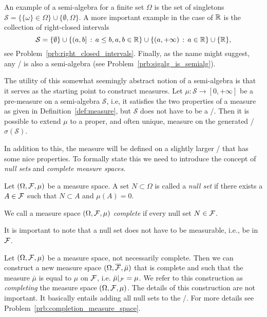 An example of a semi-algebra for a finite set $\Omega$ is the set of singletons $\mathcal{S} = \{\{\omega\} \in \Omega\} \cup \{\emptyset, \Omega\}$. A more important example in the case of $\mathbb R$ is the collection of right-closed intervals
\begin{equation}\label{def:right_closed_intervals}
	\mathcal{S} = \{\emptyset\} \cup \{(a,b] \, : \, a\le b, a, b \in \mathbb R\} \cup \{(a,+\infty) \, : \, a \in \mathbb R\} \cup \{\mathbb R\},
\end{equation}
see Problem~\ref{prb:right_closed_intervals}. Finally, as the name might suggest, any \sigalg/ is also a semi-algebra (see Problem~\ref{prb:sigalg_is_semialg}).

The utility of this somewhat seemingly abstract notion of a semi-algebra is that it serves as the starting point to construct measures. Let $\mu : \mathcal{S} \to [0,+\infty]$ be a pre-measure on a semi-algebra $\mathcal{S}$, i.e, it satisfies the two properties of a measure as given in Definition~\ref{def:measure}, but $\mathcal{S}$ does not have to be a \sigalg/. Then it is possible to extend $\mu$ to a proper, and often unique, measure on the generated \sigalg/ $\sigma(\mathcal{S})$.

In addition to this, the measure will be defined on a slightly larger \sigalg/ that has some nice properties. To formally state this we need to introduce the concept of \emph{null sets} and \emph{complete measure spaces}.

\begin{definition}
Let $(\Omega, \mathcal F, \mu)$ be a measure space. A set $N \subset \Omega$ is called a \emph{null set} if there exists a $A \in \mathcal F$ such that $N \subset A$ and $\mu(A) = 0$.

We call a measure space $(\Omega, \mathcal F, \mu)$ \emph{complete} if every null set $N \in \mathcal F$. 
\end{definition}

It is important to note that a null set does not have to be measurable, i.e., be in $\mathcal F$. 

Let $(\Omega, \mathcal F, \mu)$ be a measure space, not necessarily complete. Then we can construct a new measure space $(\Omega, \overline{\mathcal F}, \bar{\mu})$ that is complete and such that the measure $\bar{\mu}$ is equal to $\mu$ on $\mathcal F$, i.e. $\bar{\mu}|_{\mathcal F} = \mu$. We refer to this construction as \emph{completing} the measure space $(\Omega, \mathcal F, \mu)$. The details of this construction are not important. It basically entails adding all null sets to the \sigalg/. For more details see Problem~\ref{prb:completion_measure_space}.


